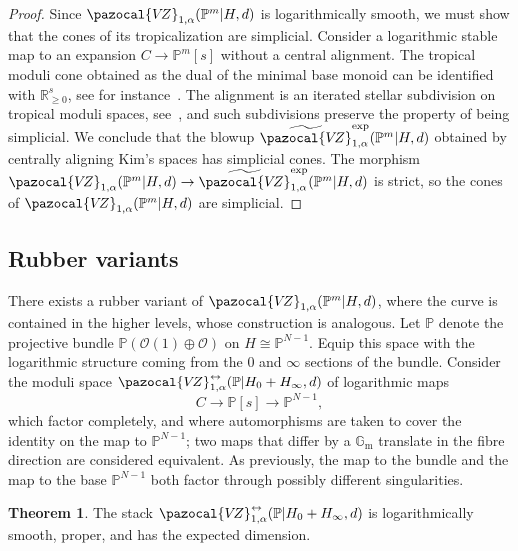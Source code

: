 \documentclass[11pt]{amsart}
\newcommand{\VZ}{\pazocal{V\!Z}}
\renewcommand{\to}{\rightarrow}
\theoremstyle{definition}
\newtheorem{thm}{Theorem}[section]
\theoremstyle{definition}
\begin{document}

\begin{proof}
Since $\VZ_{1,\alpha}(\mathbb P^m|H,d)$ is logarithmically smooth, we must show that the cones of its tropicalization are simplicial. Consider a logarithmic stable map to an expansion $C\to \mathbb P^m[s]$ without a central alignment. The tropical moduli cone obtained as the dual of the minimal base monoid can be identified with $\mathbb R_{\geq 0}^{s}$, see for instance~\cite[Section~2.2]{ChenDegeneration}. The alignment is an iterated stellar subdivision on tropical moduli spaces, see~\cite[Section 4.6]{RSPW}, and such subdivisions preserve the property of being simplicial. We conclude that the blowup $\widetilde{\VZ}^{\mathrm{exp}}_{1,\alpha}(\mathbb P^m|H,d)$ obtained by centrally aligning Kim's spaces has simplicial cones. The morphism $\VZ_{1,\alpha}(\mathbb P^m|H,d)\to \widetilde{\VZ}^{\mathrm{exp}}_{1,\alpha}(\mathbb P^m|H,d)$ is strict, so the cones of $\VZ_{1,\alpha}(\mathbb P^m|H,d)$ are simplicial.
\end{proof}

\subsection{Rubber variants}\label{subsection rubber} There exists a rubber variant of $\VZ_{1,\alpha}(\mathbb P^m|H,d)$, where the curve is contained in the higher levels, whose construction is analogous. Let $\mathbb P$ denote the projective bundle $\mathbb P(\mathcal O(1)\oplus\mathcal O)$ on $H\cong\mathbb P^{N-1}$. Equip this space with the logarithmic structure coming from the $0$ and $\infty$ sections of the bundle. Consider the moduli space $\VZ^{\leftrightarrow}_{1,\alpha}(\mathbb P|H_0+H_\infty,d)$ of logarithmic maps
\[
C\to \mathbb P[s]\to \mathbb P^{N-1},
\]
which factor completely, and where automorphisms are taken to cover the identity on the map to $\mathbb P^{N-1}$; two maps that differ by a $\mathbb G_{\operatorname{m}}$ translate in the fibre direction are considered equivalent. As previously, the map to the bundle and the map to the base $\mathbb P^{N-1}$ both factor through possibly different singularities. 

\begin{thm}\label{thm rubber log smooth}
The stack $\VZ^{\leftrightarrow}_{1,\alpha}(\mathbb P|H_0+H_\infty,d)$ is logarithmically smooth, proper, and has the expected dimension.
\end{thm}
\end{document}
